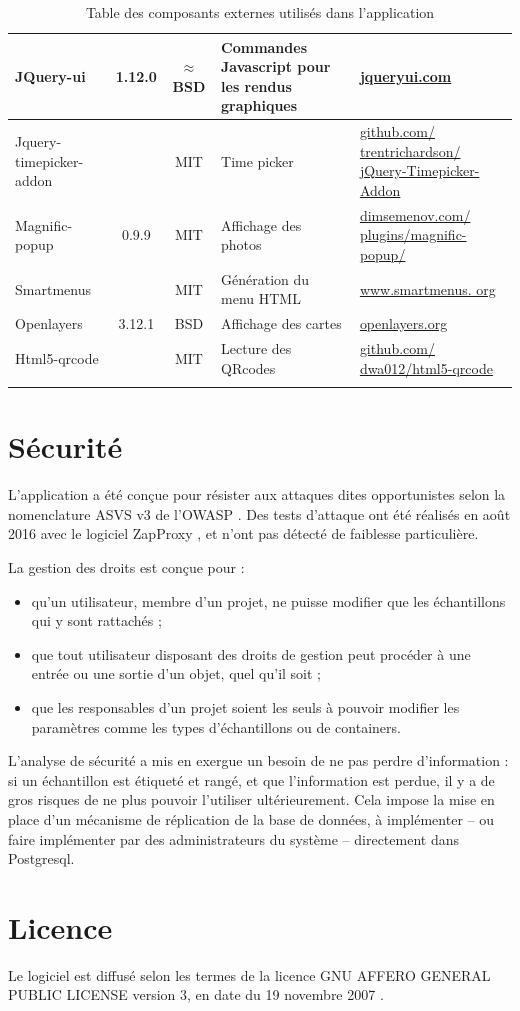 \begin{longtable}{|>{\raggedright\arraybackslash}p{3cm}|c|c|>{\raggedright\arraybackslash}p{3cm}|>{\raggedright\arraybackslash}p{3cm}|}
\hline 
JQuery-ui & 1.12.0 & $\approx$ BSD & Commandes Javascript pour les rendus graphiques & \href{http://jqueryui.com/}{jqueryui.com} \\ 
\hline 
Jquery-timepicker-addon &  & MIT & Time picker & \href{https://github.com/trentrichardson/jQuery-Timepicker-Addon}{github.com/ trentrichardson/ jQuery-Timepicker-Addon} \\ 
\hline 
Magnific-popup & 0.9.9 & MIT & Affichage des photos & \href{http://dimsemenov.com/plugins/magnific-popup/}{dimsemenov.com/ plugins/magnific-popup/}\\ 
\hline 
Smartmenus &  & MIT & Génération du menu HTML & \href{http://www.smartmenus.org}{www.smartmenus. org} \\ 
\hline 
Openlayers & 3.12.1 & BSD & Affichage des cartes & \href{http://openlayers.org/}{openlayers.org} \\ 
\hline 
Html5-qrcode &  & MIT & Lecture des QRcodes &  \href{https://github.com/dwa012/html5-qrcode}{github.com/ dwa012/html5-qrcode}\\ 
\hline 

\caption{Table des composants externes utilisés dans l'application}
\end{longtable} 

\section{Sécurité}

L'application a été conçue pour résister aux attaques dites opportunistes selon la nomenclature ASVS v3 \cite{asvs} de l'OWASP \cite{owasp}. Des tests d'attaque ont été réalisés en août 2016 avec le logiciel ZapProxy \cite{zaproxy}, et n'ont pas détecté de faiblesse particulière.

La gestion des droits est conçue pour :
\begin{itemize}
\item qu'un utilisateur, membre d'un projet, ne puisse modifier que les échantillons qui y sont rattachés ;
\item que tout utilisateur disposant des droits de gestion peut procéder à une entrée ou une sortie d'un objet, quel qu'il soit ;
\item que les responsables d'un projet soient les seuls à pouvoir modifier les paramètres comme les types d'échantillons ou de containers.
\end{itemize}
L'analyse de sécurité a mis en exergue un besoin de ne pas perdre d'information : si un échantillon est étiqueté et rangé, et que l'information est perdue, il y a de gros risques de ne plus pouvoir l'utiliser ultérieurement. Cela impose la mise en place d'un mécanisme de réplication de la base de données, à implémenter -- ou faire implémenter par des administrateurs du système -- directement dans Postgresql.

\section{Licence}
Le logiciel est diffusé selon les termes de la licence GNU AFFERO GENERAL PUBLIC LICENSE version 3, en date du 19 novembre 2007 \cite{agpl}.